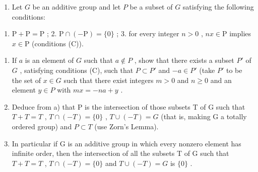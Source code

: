 \begin{enumerate}
\def\labelenumi{\arabic{enumi})}
\setcounter{enumi}{19}
\tightlist
\item
  Let \(G\) be an additive group and let \(P\) be a subset of \(G\) satisfying the following conditions:
\end{enumerate}

\begin{enumerate}
\def\labelenumi{\arabic{enumi}.}
\tightlist
\item
  \(\mathrm{P} + \mathrm{P} = \mathrm{P}\) ; 2. \(\mathrm{P} \cap (-\mathrm{P}) = \{0\}\) ; 3. for every integer \(n > 0\) , \(nx \in \mathrm{P}\) implies \(x \in \mathrm{P}\) (conditions (C)).
\end{enumerate}

\begin{enumerate}
\def\labelenumi{\alph{enumi})}
\item
  If \(a\) is an element of \(G\) such that \(a \notin P\) , show that there exists a subset \(P'\) of \(G\) , satisfying conditions (C), such that \(P \subset P'\) and \(-a \in P'\) (take \(P'\) to be the set of \(x \in G\) such that there exist integers \(m > 0\) and \(n \geqslant 0\) and an element \(y \in P\) with \(mx = -na + y\) .
\item
  Deduce from a) that P is the intersection of those subsets T of G such that \(T + T = T\) , \(T \cap (-T) = \{0\}\) , \(T \cup (-T) = G\) (that is, making G a totally ordered group) and \(P \subset T\) (use Zorn's Lemma).
\item
  In particular if G is an additive group in which every nonzero element has infinite order, then the intersection of all the subsets T of G such that \(T + T = T\) , \(T \cap (-T) = \{0\}\) and \(T \cup (-T) = G\) is \(\{0\}\) .
\end{enumerate}

